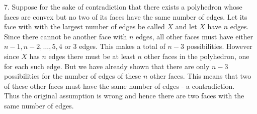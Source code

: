 \documentclass{article}
\begin{document}
7. Suppose for the sake of contradiction that there exists a polyhedron whose faces are convex but no two of its faces have the same number of edges. Let its face with with the largest number of edges be called $X$ and let $X$ have $n$ edges. Since there cannot be another face with $n$ edges, all other faces must have either $n-1, n-2, \ldots, 5, 4$ or 3 edges. This makes a total of $n-3$ possibilities. However since $X$ has $n$ edges there must be at least $n$ other faces in the polyhedron, one for each such edge. But we have already shown that there are only $n-3$ possibilities for the number of edges of these $n$ other faces. This means that two of these other faces must have the same number of edges - a contradiction. \\ Thus the original assumption is wrong and hence there are two faces with the same number of edges. 
\end{document}

